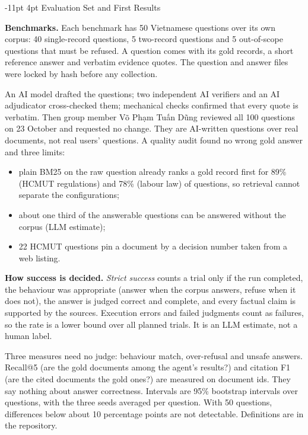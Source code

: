 \documentclass[a4paper,11pt]{article}
\makeatletter
\renewcommand\section{\@startsection{section}{1}{\z@}%
                                   {-11pt \@plus -2pt \@minus -1pt}%
                                   {4pt \@plus 1pt \@minus 1pt}%
                                   {\normalfont\large\bfseries}}
\newcommand{\hdr}[1]{\par\vspace{1.5pt}\noindent\textbf{#1}}
\makeatother
\begin{document}
\section{Evaluation Set and First Results}\label{sec:eval}
\hdr{Benchmarks.} Each benchmark has 50 Vietnamese questions over its own corpus: 40 single-record questions, 5 two-record questions and 5 out-of-scope questions that must be refused. A question comes with its gold records, a short reference answer and verbatim evidence quotes. The question and answer files were locked by hash before any collection.

An AI model drafted the questions; two independent AI verifiers and an AI adjudicator cross-checked them; mechanical checks confirmed that every quote is verbatim. Then group member Võ Phạm Tuấn Dũng reviewed all 100 questions on 23 October and requested no change. They are AI-written questions over real documents, not real users' questions. A quality audit found no wrong gold answer and three limits:
\begin{itemize}
\item plain BM25 on the raw question already ranks a gold record first for 89\% (HCMUT regulations) and 78\% (labour law) of questions, so retrieval cannot separate the configurations;
\item about one third of the answerable questions can be answered without the corpus (LLM estimate);
\item 22 HCMUT questions pin a document by a decision number taken from a web listing.
\end{itemize}

\hdr{How success is decided.} \emph{Strict success} counts a trial only if the run completed, the behaviour was appropriate (answer when the corpus answers, refuse when it does not), the answer is judged correct and complete, and every factual claim is supported by the sources. Execution errors and failed judgments count as failures, so the rate is a lower bound over all planned trials. It is an LLM estimate, not a human label.

Three measures need no judge: behaviour match, over-refusal and unsafe answers. Recall@5 (are the gold documents among the agent's results?) and citation F1 (are the cited documents the gold ones?) are measured on document ids. They say nothing about answer correctness. Intervals are 95\% bootstrap intervals over questions, with the three seeds averaged per question. With 50 questions, differences below about 10 percentage points are not detectable. Definitions are in the repository.
\end{document}
